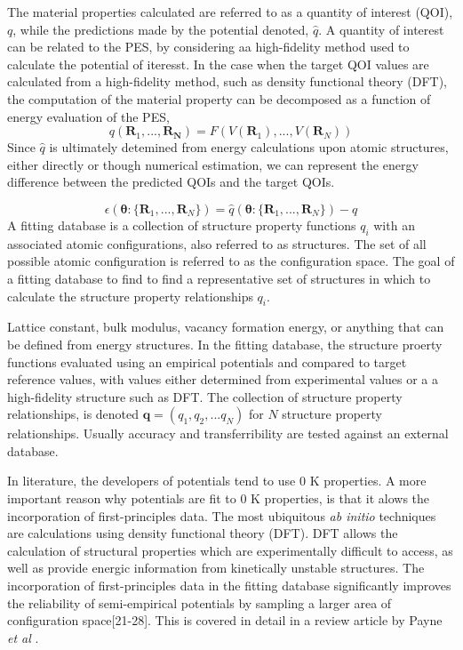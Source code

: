 The material properties calculated are referred to as a quantity of interest (QOI), $q$, while the predictions made by the potential denoted, $\hat{q}$.  
A quantity of interest can be related to the PES, by considering aa high-fidelity method used to calculate the potential of iteresst.
In the case when the target QOI values are calculated from a high-fidelity method, such as density functional theory (DFT), the computation of the material property can be decomposed as a function of energy evaluation of the PES,
\begin{equation}
	q(\bm{R}_1,...,\bm{R_N}) = F(V(\bm{R}_1),...,V(\bm{R}_N))
\end{equation}
Since $\hat{q}$ is ultimately detemined from energy calculations upon atomic structures, either directly or though numerical estimation, we can represent the energy difference between the predicted QOIs and the target QOIs.





\begin{equation}
	\epsilon(\bm{\theta}:\{\bm{R}_1,...,\bm{R}_N\})=\hat{q}(\bm{\theta}:\{\bm{R}_1,...,\bm{R}_N\})-q
\end{equation}
A fitting database is a collection of structure property functions $q_i$ with an associated atomic configurations, also referred to as structures.
The set of all possible atomic configuration is referred to as the configuration space.
The goal of a fitting database to find to find a representative set of structures in which to calculate the structure property relationships $q_i$.

Lattice constant, bulk modulus, vacancy formation energy, or anything that can be defined from energy structures.  In the fitting database, the structure proerty functions evaluated using an empirical potentials and compared to target reference values, with values either determined from experimental values or a a high-fidelity structure such as DFT.  The collection of structure property relationships, is denoted $\bm{q}=(q_1,q_2,...q_N)$ for $N$ structure property relationships.  Usually accuracy and transferribility are tested against an external database.

In literature, the developers of potentials tend to use $0$ K properties.  A more important reason why potentials are fit to $0$ K properties, is that it alows the incorporation of first-principles data.
The most ubiquitous \emph{ab initio} techniques are calculations using density functional theory (DFT).
DFT allows the calculation of structural properties which are experimentally difficult to access, as well as provide energic information from kinetically unstable structures.
The incorporation of first-principles data in the fitting database significantly improves the reliability of semi-empirical potentials by sampling a larger area of configuration space[21-28].
This is covered in detail in a review article by Payne \emph{et al} \cite{payne1996_dft_database}.

